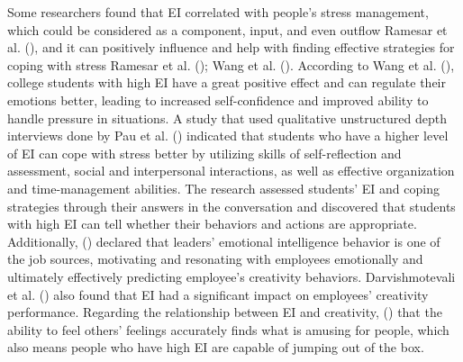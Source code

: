 \documentclass[
  man,
  longtable,
  nolmodern,
  notxfonts,
  notimes,
  colorlinks=true,linkcolor=blue,citecolor=blue,urlcolor=blue]{apa7}
\begin{document}
Some researchers found that EI correlated with people's stress
management, which could be considered as a component, input, and even
outflow Ramesar et al. (), and it can
positively influence and help with finding effective strategies for
coping with stress Ramesar et al. ();
Wang et al. (). According to Wang et al.
(), college students with high EI have a
great positive effect and can regulate their emotions better, leading to
increased self-confidence and improved ability to handle pressure in
situations. A study that used qualitative unstructured depth interviews
done by Pau et al. () indicated that
students who have a higher level of EI can cope with stress better by
utilizing skills of self-reflection and assessment, social and
interpersonal interactions, as well as effective organization and
time-management abilities. The research assessed students' EI and coping
strategies through their answers in the conversation and discovered that
students with high EI can tell whether their behaviors and actions are
appropriate. Additionally,
() declared that
leaders' emotional intelligence behavior is one of the job sources,
motivating and resonating with employees emotionally and ultimately
effectively predicting employee's creativity behaviors. Darvishmotevali
et al. () also found that EI had
a significant impact on employees' creativity performance. Regarding the
relationship between EI and creativity,
() that
the ability to feel others' feelings accurately finds what is amusing
for people, which also means people who have high EI are capable of
jumping out of the box.
\end{document}
